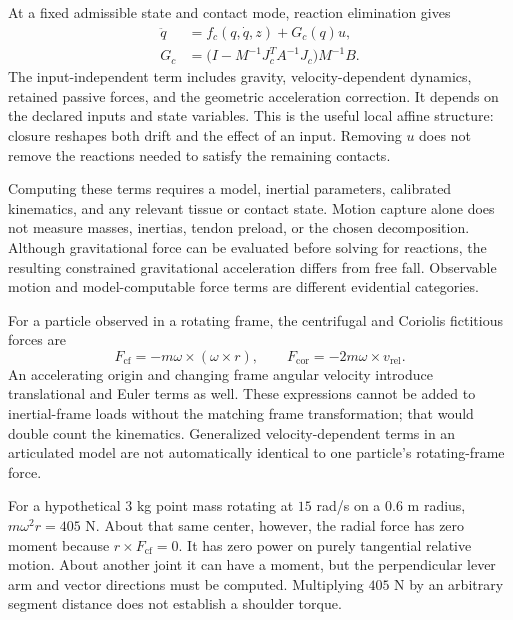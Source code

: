 At a fixed admissible state and contact mode, reaction elimination gives
\begin{equation}
 \begin{aligned}
 \ddot q &= f_c(q,\dot q,z)+G_c(q)u,\\
 G_c &=\big(I-M^{-1}J_c^TA^{-1}J_c\big)M^{-1}B.
 \end{aligned}
 \label{eq:constrained_affine_dynamics}
\end{equation}
The input-independent term includes gravity, velocity-dependent dynamics,
retained passive forces, and the geometric acceleration correction. It depends
on the declared inputs and state variables. This is the useful local affine
structure: closure reshapes both drift and the effect of an input. Removing
$u$ does not remove the reactions needed to satisfy the remaining contacts.

Computing these terms requires a model, inertial parameters, calibrated
kinematics, and any relevant tissue or contact state. Motion capture alone
does not measure masses, inertias, tendon preload, or the chosen decomposition.
Although gravitational force can be evaluated before solving for reactions,
the resulting constrained gravitational acceleration differs from free fall.
Observable motion and model-computable force terms are different evidential
categories.

For a particle observed in a rotating frame, the centrifugal and Coriolis
fictitious forces are
\begin{equation}
 F_{\mathrm{cf}}=-m\omega\times(\omega\times r),\qquad
 F_{\mathrm{cor}}=-2m\omega\times v_{\mathrm{rel}}.
 \label{eq:rotating_frame_forces}
\end{equation}
An accelerating origin and changing frame angular velocity introduce translational
and Euler terms as well. These expressions cannot be added to inertial-frame
loads without the matching frame transformation; that would double count the
kinematics. Generalized velocity-dependent terms in an articulated model are
not automatically identical to one particle's rotating-frame force.

For a hypothetical $3$ kg point mass rotating at $15$ rad/s on a $0.6$ m radius,
$m\omega^2r=405$ N. About that same center, however, the radial force has zero
moment because $r\times F_{\mathrm{cf}}=0$. It has zero power on purely tangential
relative motion. About another joint it can have a moment, but the perpendicular
lever arm and vector directions must be computed. Multiplying $405$ N by an
arbitrary segment distance does not establish a shoulder torque.

